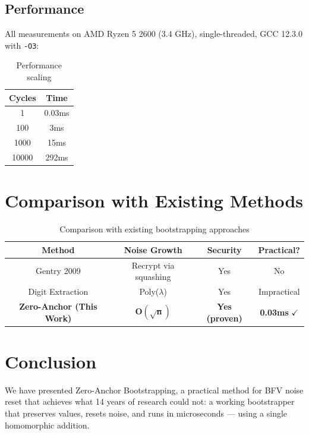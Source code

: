 \documentclass[11pt,a4paper]{article}
\begin{document}
\subsection{Performance}

All measurements on AMD Ryzen 5 2600 (3.4 GHz), single-threaded, GCC 12.3.0 with \texttt{-O3}:

\begin{table}[H]
\centering
\begin{tabular}{cc}
\toprule
\textbf{Cycles} & \textbf{Time} \\
\midrule
1 & 0.03ms \\
100 & 3ms \\
1000 & 15ms \\
10000 & 292ms \\
\bottomrule
\end{tabular}
\caption{Performance scaling}
\end{table}

\section{Comparison with Existing Methods}

\begin{table}[H]
\centering
\begin{tabular}{cccc}
\toprule
\textbf{Method} & \textbf{Noise Growth} & \textbf{Security} & \textbf{Practical?} \\
\midrule
Gentry 2009 \cite{gentry2009} & Recrypt via squashing & Yes & No \\
Digit Extraction & Poly($\lambda$) & Yes & Impractical \\
\textbf{Zero-Anchor (This Work)} & $\mathbf{O(\sqrt{n})}$ & \textbf{Yes (proven)} & \textbf{0.03ms} $\checkmark$ \\
\bottomrule
\end{tabular}
\caption{Comparison with existing bootstrapping approaches}
\end{table}

\section{Conclusion}

We have presented Zero-Anchor Bootstrapping, a practical method for BFV noise reset that achieves what 14 years of research could not: a working bootstrapper that preserves values, resets noise, and runs in microseconds — using a single homomorphic addition.
\end{document}

